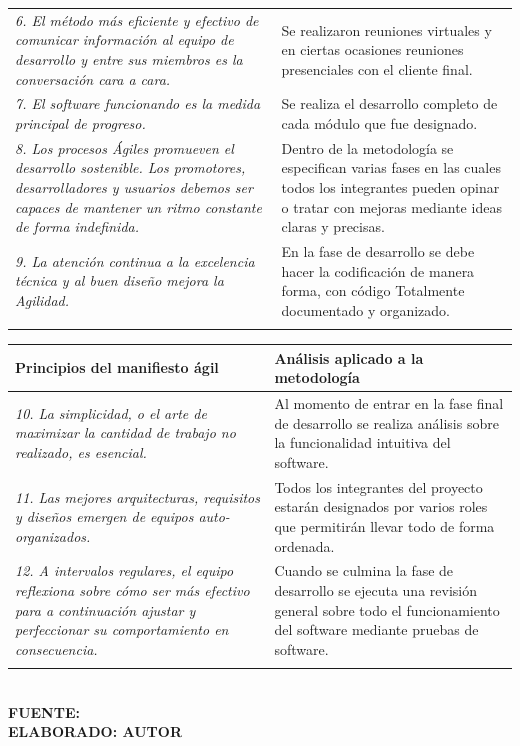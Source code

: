 \begin{table}[h!]
\begin{tabular}{p{7cm}p{7cm}}
		\addlinespace
		\textit{6. El método más eficiente y efectivo de comunicar información al equipo de desarrollo y entre sus miembros es la conversación cara a cara.} & Se realizaron reuniones virtuales y en ciertas ocasiones reuniones presenciales con el cliente final. \\
		\addlinespace
		\textit{7. El software funcionando es la medida principal de progreso.}  & Se realiza el desarrollo completo de cada módulo que fue designado. \\
		\addlinespace
		\textit{8. Los procesos Ágiles promueven el desarrollo sostenible. Los promotores, desarrolladores y usuarios debemos ser capaces de mantener un ritmo constante de forma indefinida.}  & Dentro de la metodología se especifican varias fases en las cuales todos los integrantes pueden opinar o tratar con mejoras mediante ideas claras y precisas. \\
		\addlinespace
		\textit{9. La atención continua a la excelencia técnica y al buen diseño mejora la Agilidad.} & En la fase de desarrollo se debe hacer la codificación de manera forma, con código Totalmente documentado y organizado. \\
		\addlinespace
		\bottomrule
	\end{tabular}
	
\end{table}

\begin{table}
	\centering
	\begin{tabular}{p{7cm}p{7cm}}
		\toprule
		\textbf{Principios del manifiesto ági}l & \textbf{Análisis aplicado a la metodología} \\
		\midrule
		\textit{10. La simplicidad, o el arte de maximizar la cantidad de trabajo no realizado, es esencial.} & Al momento de entrar en la fase final de desarrollo se realiza análisis sobre la funcionalidad intuitiva del software. \\
		\addlinespace
		\textit{11. Las mejores arquitecturas, requisitos y diseños emergen de equipos auto-organizados.} & Todos los integrantes del proyecto estarán designados por varios roles que permitirán llevar todo de forma ordenada. \\
		\addlinespace
		\textit{12. A intervalos regulares, el equipo reflexiona sobre cómo ser más efectivo para a continuación ajustar y perfeccionar su comportamiento en consecuencia. } & Cuando se culmina la fase de desarrollo se ejecuta una revisión general sobre todo el funcionamiento del software mediante pruebas de software. \\
		\addlinespace
		\bottomrule
	\end{tabular}
	\vspace{4mm}
	{\footnotesize \textbf{\\ FUENTE: \cite{managil} \\ ELABORADO: AUTOR}}
\end{table}

